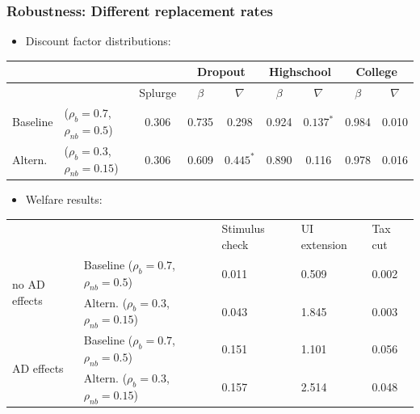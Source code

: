 \documentclass[pdflatex,aspectratio=169]{beamer}
\begin{document}
\begin{frame}
	\frametitle{Robustness: Different replacement rates}
	\centering  
	\small 
	
	\begin{itemize}[<+->]
		\item Discount factor distributions: 
	\end{itemize}

	\begin{table}
		\begin{tabular}{llc|cccccc} 
			\toprule
			& & & \multicolumn{2}{c}{Dropout} & \multicolumn{2}{c}{Highschool} & \multicolumn{2}{c}{College} \\ \midrule 
			& & Splurge & $\beta$ & $\nabla$ & $\beta$ & $\nabla$ & $\beta$ & $\nabla$ \\ \midrule 
			Baseline & ($\rho_{b}=0.7$, $\rho_{nb}=0.5$) & 0.306 & 0.735 & 0.298 & 0.924 & $0.137^{*}$ & 0.984 & 0.010 \\ 
			Altern. & ($\rho_{b}=0.3$,  $\rho_{nb}=0.15$) & 0.306 & 0.609 & $0.445^{*}$ & 0.890 & 0.116 & 0.978 & 0.016
			\\ \bottomrule 
		\end{tabular}
	
	
	\begin{itemize}[<+->]
		\item Welfare results: 
	\end{itemize}
		
		\begin{tabular}{@{}lllll@{}}
			\toprule
			&                    & Stimulus check & UI extension & Tax cut \\ \cmidrule(l){1-5} 
			\multirow{2}{*}{no AD effects} 	& Baseline  ($\rho_{b}=0.7$, $\rho_{nb}=0.5$) 		& 0.011          & 0.509        & 0.002   \\
			& Altern.  ($\rho_{b}=0.3$, $\rho_{nb}=0.15$) 	& 0.043          & 1.845        & 0.003   \\ \cmidrule(l){1-5} 
			\multirow{2}{*}{AD effects}		& Baseline  ($\rho_{b}=0.7$, $\rho_{nb}=0.5$)    	& 0.151          & 1.101        & 0.056   \\
			& Altern.  ($\rho_{b}=0.3$, $\rho_{nb}=0.15$)    & 0.157          & 2.514        & 0.048   \\ \cmidrule(l){1-5} 
		\end{tabular}
	\end{table}
\end{frame}
\end{document}
